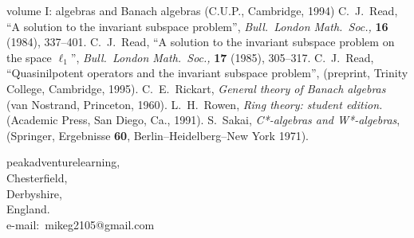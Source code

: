 \documentclass[11pt]{article}
\begin{document}
\begin{thebibliography}{99}
{volume I: algebras and Banach algebras} (C.U.P., Cambridge, 1994)
 C.~J.~Read, ``A solution to the invariant subspace problem'',
{\em Bull.\ London Math.\ Soc.,} {\bf 16} (1984), 337--401. %
 C.~J.~Read, ``A solution to the invariant subspace problem
on the space $\ell_1$'', {\em Bull.\ London Math.\ Soc.,} {\bf 17} (1985),
305--317. %
 C.~J.~Read, ``Quasinilpotent operators and the invariant
subspace problem'', (preprint, Trinity College, Cambridge, 1995).
 C.~E.~Rickart, {\em General theory of Banach algebras}
(van Nostrand, Princeton, 1960).
 L.~H.~Rowen, {\em Ring theory: student edition.}
(Academic Press, San Diego, Ca., 1991).
 S.~Sakai, {\em C*-algebras and W*-algebras},
(Springer, Ergebnisse {\bf 60}, Berlin--Heidelberg--New York 1971).
\end{thebibliography}
\vspace{\baselineskip}

\noindent
peakadventurelearning, \\
Chesterfield,\\
Derbyshire,\\
England. \\[1 ex]
e-mail:~mikeg2105@gmail.com
\end{document}
